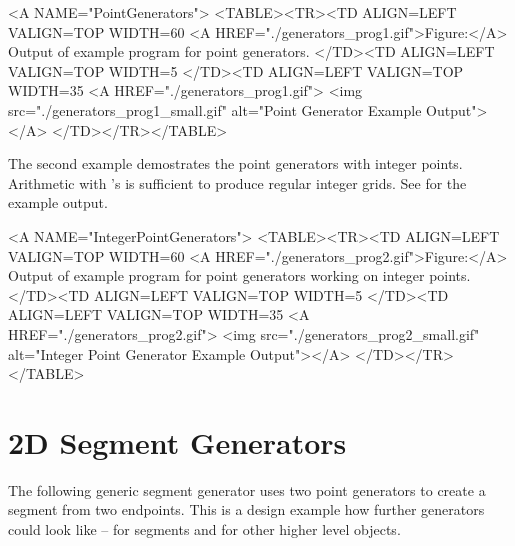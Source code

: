 \begin{ccHtmlOnly}
  <A NAME="PointGenerators">
  <TABLE><TR><TD ALIGN=LEFT VALIGN=TOP WIDTH=60%
    <A HREF="./generators_prog1.gif">Figure:</A>
    Output of example program for point generators.
  </TD><TD ALIGN=LEFT VALIGN=TOP WIDTH=5%
  </TD><TD ALIGN=LEFT VALIGN=TOP WIDTH=35%
    <A HREF="./generators_prog1.gif">
        <img src="./generators_prog1_small.gif" 
             alt="Point Generator Example Output"></A>
  </TD></TR></TABLE>
\end{ccHtmlOnly}


The second example demostrates the point generators with integer
points. Arithmetic with 's is sufficient to produce
regular integer grids. See 
for the example output.


\begin{ccHtmlOnly}
  <A NAME="IntegerPointGenerators">
  <TABLE><TR><TD ALIGN=LEFT VALIGN=TOP WIDTH=60%
    <A HREF="./generators_prog2.gif">Figure:</A>
        Output of example program for point generators working
        on integer points.
  </TD><TD ALIGN=LEFT VALIGN=TOP WIDTH=5%
  </TD><TD ALIGN=LEFT VALIGN=TOP WIDTH=35%
    <A HREF="./generators_prog2.gif">
        <img src="./generators_prog2_small.gif" 
             alt="Integer Point Generator Example Output"></A>
  </TD></TR></TABLE>
\end{ccHtmlOnly}


\newpage
\section{2D Segment Generators}

The following generic segment generator uses two point generators to
create a segment from two endpoints. This is a design example how
further generators could look like -- for segments and for other
higher level objects.


